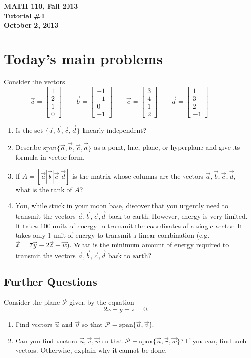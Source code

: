 \documentclass[11pt]{exam}
\renewcommand{\span}{\mathrm{span}}
\newcommand{\mat}[1]{\begin{bmatrix}#1\end{bmatrix}}
\newcommand{\mthCourse}{MATH 110}
\newcommand{\mthTerm}{Fall 2013}
\newcommand{\mthTutorialNumber}{4}
\newcommand{\mthDate}{October 2, 2013}
\begin{document}
{\large
	\begin{center}
		{\bf \mthCourse, \mthTerm}\\ 
		{\bf Tutorial \#\mthTutorialNumber}\\
		{\bf \mthDate}
	\end{center}
}

\section*{Today's main problems}

Consider the vectors 
\[
	\vec a = \mat{1\\2\\1\\0}\qquad
	\vec b = \mat{-1\\-1\\0\\-1}\qquad
	\vec c = \mat{3\\4\\1\\2}\qquad
	\vec d = \mat{1\\3\\2\\-1}\qquad
\]

\begin{enumerate}
	\item Is the set $\{\vec a,\vec b,\vec c,\vec d\}$ linearly independent?
	\item Describe $\span\{\vec a,\vec b,\vec c,\vec d\}$ as a point, line,
		plane, or hyperplane and give its formula in vector form.
	\item If $A=[\vec a|\vec b|\vec c|\vec d]$ is the matrix whose columns are 
		the vectors $\vec a,\vec b,\vec c,\vec d$, what is the rank of $A$?
	\item You, while stuck in your moon base, discover that you urgently
		need to transmit the vectors $\vec a,\vec b,\vec c,\vec d$
		back to earth.  However, energy is very limited.  It takes
		100 units of energy to transmit the coordinates of a single
		vector.  It takes only 1 unit of energy to transmit a
		linear combination (e.g. $\vec x=7\vec y-2\vec z+\vec w$).
		What is the minimum amount of energy required to transmit 
		the vectors $\vec a,\vec b,\vec c,\vec d$ back to earth?
	
\end{enumerate}
\subsection*{Further Questions}
	Consider the plane $\mathcal P$ given by the equation
	\[
		2x-y+z=0.
	\]
\begin{enumerate}[resume]
	\item Find 
	vectors $\vec u$ and $\vec v$ so that $\mathcal{P}=\span\{\vec u,\vec v\}$.

	\item Can you find vectors $\vec u,\vec v,\vec w$ so that $\mathcal{P}=\span\{\vec u,
	\vec v,\vec w\}$?  If you can, find such vectors.  Otherwise, explain why it
		cannot be done.
\end{enumerate}
\end{document}
